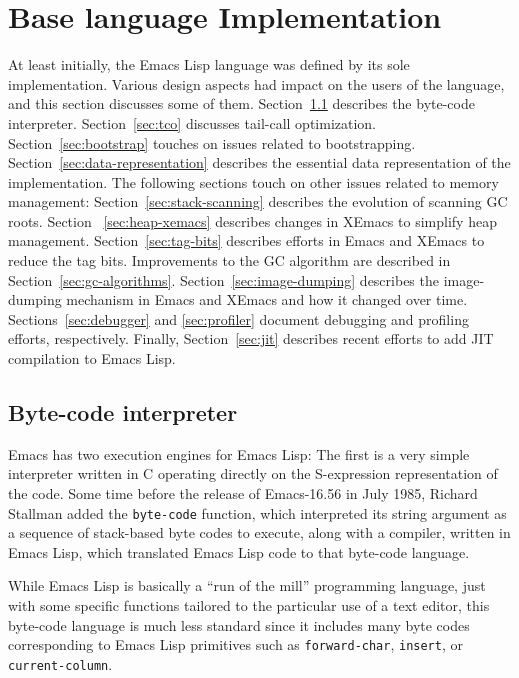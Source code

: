 \documentclass[format=acmsmall, review]{acmart}
\newcommand \Elisp {Emacs Lisp}
\begin{document}
\section{Base language Implementation}
\label{sec:base-language-implementation}

At least initially, the \Elisp{} language was defined by its sole
implementation.  Various design aspects had impact on the users of the
language, and this section discusses some of them.
Section~\ref{sec:byte-code-interpreter} describes the byte-code
interpreter.
Section~\ref{sec:tco} discusses tail-call optimization.
Section~\ref{sec:bootstrap} touches on issues related to bootstrapping.
Section~\ref{sec:data-representation} describes the
essential data representation of the implementation.  The following
sections touch on other issues related to memory management:
Section~\ref{sec:stack-scanning} describes the evolution of scanning
GC roots. Section ~\ref{sec:heap-xemacs} describes changes in XEmacs
to simplify heap management.  Section~\ref{sec:tag-bits} describes
efforts in Emacs and XEmacs to reduce the tag bits.  Improvements to
the GC algorithm are described in Section~\ref{sec:gc-algorithms}.
Section~\ref{sec:image-dumping} describes the
image-dumping mechanism in Emacs and XEmacs and how it changed over time.
Sections~\ref{sec:debugger} and \ref{sec:profiler} document
debugging and profiling efforts, respectively.  Finally,
Section~\ref{sec:jit} describes recent efforts to add JIT compilation
to \Elisp{}.

\subsection{Byte-code interpreter}
\label{sec:byte-code-interpreter}

Emacs has two execution engines for \Elisp: The first is a very simple
interpreter written in C operating directly on the S-expression
representation of the code.
Some time before the release of Emacs-16.56 in July 1985,
Richard Stallman added the \texttt{byte-code} function, which interpreted its string
argument as a sequence of stack-based byte codes to execute, along with
a compiler, written in \Elisp{}, which translated \Elisp{} code to that
byte-code language.

While \Elisp{} is basically a ``run of the mill'' programming language, just
with some specific functions tailored to the particular use of a text
editor, this byte-code language is much less standard since it includes many
byte codes corresponding to \Elisp{} primitives such as
\texttt{forward-char}, \texttt{insert}, or \texttt{current-column}.
\end{document}
